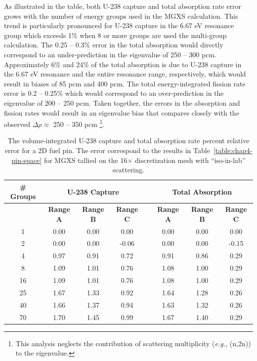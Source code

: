 As illustrated in the table, both U-238 capture and total absorption rate error grows with the number of energy groups used in the \ac{MGXS} calculation. This trend is particularly pronounced for U-238 capture in the 6.67 eV resonance group which exceeds 1\% when 8 or more groups are used the multi-group calculation. The 0.25 -- 0.3\% error in the total absorption would directly correspond to an under-prediction in the eigenvalue of 250 -- 300 pcm. Approximately 6\% and 24\% of the total absorption is due to U-238 capture in the 6.67 eV resonance and the entire resonance range, respectively, which would result in biases of 85 pcm and 400 pcm. The total energy-integrated fission rate error is 0.2 -- 0.25\% which would correspond to an over-prediction in the eigenvalue of 200 -- 250 pcm. Taken together, the errors in the absorption and fission rates would result in an eigenvalue bias that compares closely with the observed $\Delta\rho \approx$ 250 -- 350 pcm \footnote{This analysis neglects the contribution of scattering multiplicity (\textit{e.g.,} (n,2n)) to the eigenvalue.}.

\begin{table}[h!]
  \centering
  \caption[Reaction rate relative error for a 2D fuel pin.]{The volume-integrated U-238 capture and total absorption rate percent relative error for a 2D fuel pin. The error correspond to the results in Table~\ref{table:chap4-pin-space} for \ac{MGXS} tallied on the 16$\times$ discretization mesh with ``iso-in-lab'' scattering.}
  \small
  \label{table:chap4-pin-capture-errors} 
  \vspace{6pt}
  \begin{tabular}{c c c c c c c c}
  \toprule
  \multicolumn{1}{c}{\bf \# Groups} &
  \multicolumn{3}{c}{\bf U-238 Capture} &
  \multicolumn{1}{c}{} &
  \multicolumn{3}{c}{\bf Total Absorption} \\
  \midrule
  & \multicolumn{1}{c}{\bf Range A} &
  \multicolumn{1}{c}{\bf Range B} &
  \multicolumn{1}{c}{\bf Range C} &
  \multicolumn{1}{c}{} &
  \multicolumn{1}{c}{\bf Range A} &
  \multicolumn{1}{c}{\bf Range B} &
  \multicolumn{1}{c}{\bf Range C} \\
  \cline{2-4} \cline{6-8}
1 & 0.00 & 0.00 & 0.00 & & 0.00 & 0.00 & 0.00 \\
2 & 0.00 & 0.00 & -0.06 & & 0.00 & 0.00 & -0.15 \\
4 & 0.97 & 0.91 & 0.72 & & 0.91 & 0.86 & 0.29 \\
8 & 1.09 & 1.01 & 0.76 & & 1.08 & 1.00 & 0.29 \\
16 & 1.09 & 1.01 & 0.76 & & 1.08 & 1.00 & 0.29 \\
25 & 1.67 & 1.33 & 0.92 & & 1.64 & 1.28 & 0.26 \\
40 & 1.66 & 1.37 & 0.94 & & 1.63 & 1.32 & 0.26 \\
70 & 1.70 & 1.45 & 0.99 & & 1.67 & 1.40 & 0.29 \\
  \bottomrule
\end{tabular}
\end{table}

